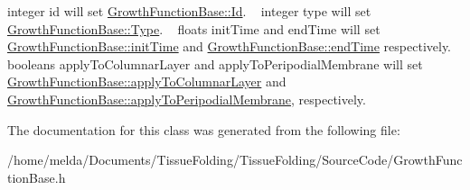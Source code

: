 integer id will set \hyperlink{classGrowthFunctionBase_aa669a940ab77009f9b2b9c9885e9cd9e}{Growth\+Function\+Base\+::\+Id}. ~\newline
integer type will set \hyperlink{classGrowthFunctionBase_a90fc4b14e2adcda0930fe93b1490fb7a}{Growth\+Function\+Base\+::\+Type}. ~\newline
floats init\+Time and end\+Time will set \hyperlink{classGrowthFunctionBase_ae92513a7b41637df8e26e7db35ddf97c}{Growth\+Function\+Base\+::init\+Time} and \hyperlink{classGrowthFunctionBase_a3ff4db0573d354a75666a5f3ca446941}{Growth\+Function\+Base\+::end\+Time} respectively. ~\newline
booleans apply\+To\+Columnar\+Layer and apply\+To\+Peripodial\+Membrane will set \hyperlink{classGrowthFunctionBase_a3d56771e7c145589a14e11cc331e0326}{Growth\+Function\+Base\+::apply\+To\+Columnar\+Layer} and \hyperlink{classGrowthFunctionBase_a08ae19f58cb98fa8e315a77f52749732}{Growth\+Function\+Base\+::apply\+To\+Peripodial\+Membrane}, respectively. ~\newline
 

The documentation for this class was generated from the following file\+:\begin{DoxyCompactItemize}
\item 
/home/melda/\+Documents/\+Tissue\+Folding/\+Tissue\+Folding/\+Source\+Code/Growth\+Function\+Base.\+h\end{DoxyCompactItemize}
